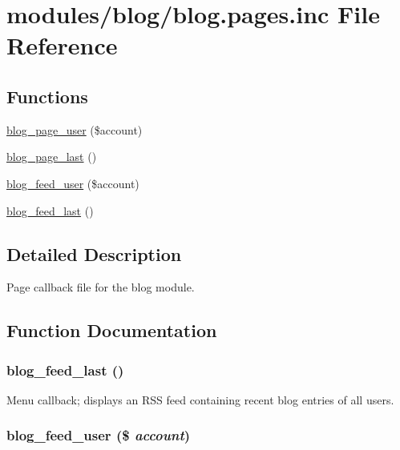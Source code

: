 \hypertarget{blog_8pages_8inc}{
\section{modules/blog/blog.pages.inc File Reference}
\label{blog_8pages_8inc}
}
\subsection*{Functions}
\begin{CompactItemize}
\item 
\hyperlink{blog_8pages_8inc_87fd5ef697f7fc4cccaf2c54933cc29a}{blog\_\-page\_\-user} (\$account)
\item 
\hyperlink{blog_8pages_8inc_6720685209529757688eed74112994e4}{blog\_\-page\_\-last} ()
\item 
\hyperlink{blog_8pages_8inc_d543fb1fb96c40cb48615bc78dfa18e9}{blog\_\-feed\_\-user} (\$account)
\item 
\hyperlink{blog_8pages_8inc_4b08fa8027c0eaf79656992095ee33e5}{blog\_\-feed\_\-last} ()
\end{CompactItemize}


\subsection{Detailed Description}
Page callback file for the blog module. 

\subsection{Function Documentation}
\hypertarget{blog_8pages_8inc_4b08fa8027c0eaf79656992095ee33e5}{
\subsubsection[{blog\_\-feed\_\-last}]{\setlength{\rightskip}{0pt plus 5cm}blog\_\-feed\_\-last ()}}
\label{blog_8pages_8inc_4b08fa8027c0eaf79656992095ee33e5}


Menu callback; displays an RSS feed containing recent blog entries of all users. \hypertarget{blog_8pages_8inc_d543fb1fb96c40cb48615bc78dfa18e9}{
\subsubsection[{blog\_\-feed\_\-user}]{\setlength{\rightskip}{0pt plus 5cm}blog\_\-feed\_\-user (\$ {\em account})}}
\label{blog_8pages_8inc_d543fb1fb96c40cb48615bc78dfa18e9}


